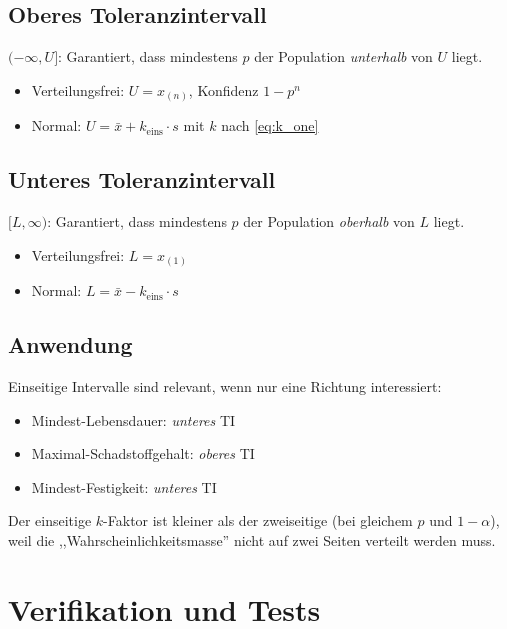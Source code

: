 \documentclass[10pt,a4paper,twocolumn]{article}
\theoremstyle{definition}
\newcommand{\xbar}{\bar{x}}
\begin{document}
\subsection{Oberes Toleranzintervall}
$(-\infty, U]$: Garantiert, dass mindestens $p$ der Population
\emph{unterhalb} von $U$ liegt.
\begin{itemize}[nosep,leftmargin=*]
    \item Verteilungsfrei: $U = x_{(n)}$, Konfidenz $1 - p^n$
    \item Normal: $U = \xbar + k_{\text{eins}} \cdot s$
          mit $k$ nach \cref{eq:k_one}
\end{itemize}

\subsection{Unteres Toleranzintervall}
$[L, \infty)$: Garantiert, dass mindestens $p$ der Population
\emph{oberhalb} von $L$ liegt.
\begin{itemize}[nosep,leftmargin=*]
    \item Verteilungsfrei: $L = x_{(1)}$
    \item Normal: $L = \xbar - k_{\text{eins}} \cdot s$
\end{itemize}

\subsection{Anwendung}

Einseitige Intervalle sind relevant, wenn nur eine Richtung
interessiert:
\begin{itemize}[nosep,leftmargin=*]
    \item Mindest-Lebensdauer: \emph{unteres} TI
    \item Maximal-Schadstoffgehalt: \emph{oberes} TI
    \item Mindest-Festigkeit: \emph{unteres} TI
\end{itemize}

Der einseitige $k$-Faktor ist kleiner als der zweiseitige
(bei gleichem $p$ und $1-\alpha$), weil die
,,Wahrscheinlichkeitsmasse'' nicht auf zwei Seiten verteilt werden
muss.


\section{Verifikation und Tests}
\label{sec:tests}
\end{document}
